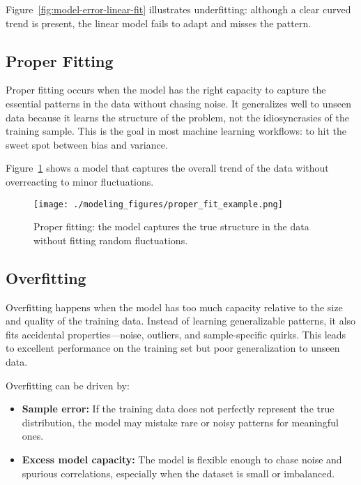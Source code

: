 \documentclass[12pt,openany]{book}
\begin{document}
Figure~\ref{fig:model-error-linear-fit} illustrates underfitting: although a clear curved trend is present, the linear model fails to adapt and misses the pattern.


\subsection{Proper Fitting}

Proper fitting occurs when the model has the right capacity to capture the essential patterns in the data without chasing noise. It generalizes well to unseen data because it learns the structure of the problem, not the idiosyncrasies of the training sample. This is the goal in most machine learning workflows: to hit the sweet spot between bias and variance. \newline

Figure~\ref{fig:proper-fitting-example} shows a model that captures the overall trend of the data without overreacting to minor fluctuations.

\begin{figure}[H]
    \centering
    \texttt{[image: ./modeling\_figures/proper\_fit\_example.png]}
    \caption{Proper fitting: the model captures the true structure in the data without fitting random fluctuations.}
    \label{fig:proper-fitting-example}
\end{figure}


\subsection{Overfitting}

Overfitting happens when the model has too much capacity relative to the size and quality of the training data. Instead of learning generalizable patterns, it also fits accidental properties—noise, outliers, and sample-specific quirks. This leads to excellent performance on the training set but poor generalization to unseen data. \newline

Overfitting can be driven by:
\begin{itemize}
    \item \textbf{Sample error:} If the training data does not perfectly represent the true distribution, the model may mistake rare or noisy patterns for meaningful ones.
    \item \textbf{Excess model capacity:} The model is flexible enough to chase noise and spurious correlations, especially when the dataset is small or imbalanced.
\end{itemize}
\end{document}
